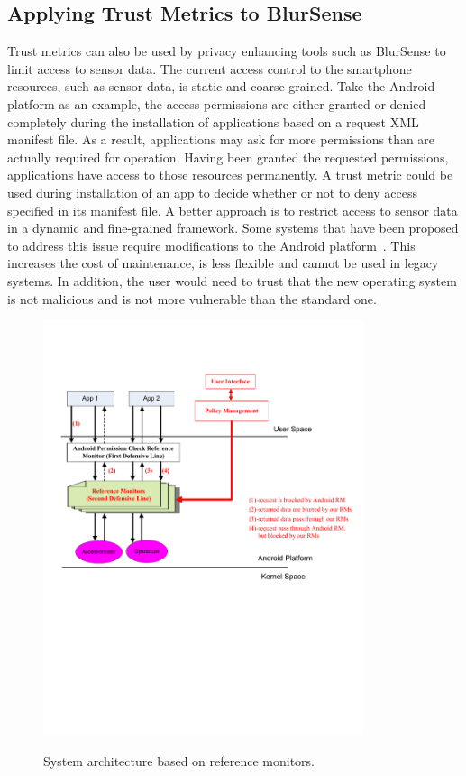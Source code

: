 \subsection{Applying Trust Metrics to BlurSense}
Trust metrics can also be used by privacy enhancing tools such as BlurSense to limit access to sensor data.
The current access control to the smartphone resources,
such as sensor data, is static and coarse-grained. 
Take the
Android platform as an example, the access permissions are
either granted or denied completely during the installation of
applications based on a request XML manifest file. As a result,
applications may ask for more permissions than are actually
required for operation. Having been granted the requested
permissions, applications have access to those resources permanently. 
A trust metric could be used during installation of an app to decide whether or not
to deny access specified in its manifest file.  
A better approach is to restrict access to sensor data in a
dynamic and fine-grained framework.
Some systems that have been proposed to address this
issue require modifications to the Android
platform~\cite{conti2011crepe, hornyack2011these}. This increases the cost of maintenance, is
less flexible and cannot be used in legacy systems. In addition,
the user would need to trust that the new operating system is
not malicious and is not more vulnerable than the standard one.

\begin{figure}%
  \centering
  \includegraphics[width=3.7in]{refMonDesign.pdf}\\
  \caption{System architecture based on reference monitors.}
  \label{Fig:design}
\end{figure}

